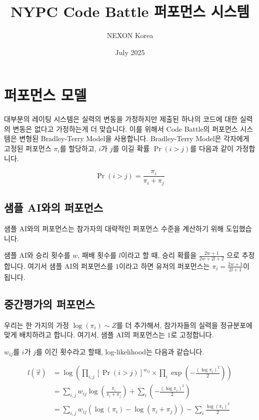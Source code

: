 \documentclass{article}
\title{NYPC Code Battle 퍼포먼스 시스템}
\author{NEXON Korea}
\date{July 2025}
\newcommand{\Prf}[1]{\Pr(#1)}
\begin{document}
\maketitle

\section{퍼포먼스 모델}

대부분의 레이팅 시스템은 실력의 변동을 가정하지만 제출된 하나의 코드에 대한 실력의 변동은 없다고 가정하는게 더 맞습니다. 이를 위해서 Code Battle의 퍼포먼스 시스템은 변형된 Bradley-Terry Model을 사용합니다. Bradley-Terry Model은 각자에게 고정된 퍼포먼스 $\pi_i$를 할당하고, $i$가 $j$를 이길 확률 $\Prf{i>j}$를 다음과 같이 가정합니다. \cite{azermelo1929}

$$\Prf{i > j} = \frac{\pi_i}{\pi_i + \pi_j} $$

\subsection{샘플 AI와의 퍼포먼스}

샘플 AI와의 퍼포먼스는 참가자의 대략적인 퍼포먼스 수준을 계산하기 위해 도입했습니다. 

샘플 AI와 승리 횟수를 $w$, 패배 횟수를 $l$이라고 할 때, 승리 확률을 $\frac{2w+1}{2w+2l+2}$ 으로 추정합니다. 여기서 샘플 AI의 퍼포먼스를 $1$이라고 하면 유저의 퍼포먼스는 $\pi_i = \frac{2w+1}{2l+1}$이 됩니다.

\subsection{중간평가의 퍼포먼스}

우리는 한 가지의 가정 $\log (\pi_i) \sim Z$를 더 추가해서, 참가자들의 실력을 정규분포에 맞게 배치하려고 합니다. 여기서, 샘플 AI의 퍼포먼스는 $1$로 고정합니다.

$w_{ij}$를 $i$가 $j$를 이긴 횟수라고 할때, log-likelihood는 다음과 같습니다.

\begin{align*}
l(\vec{\pi}) 
&= \log\left(
    \prod_{i,j} \left[\Prf{i > j}\right]^{w_{ij}} 
    \times \prod_i \exp\left(-\frac{(\log \pi_i)^2}{2}\right)
  \right) \\
&= \sum_{i,j} w_{ij} \log\left(\frac{\pi_i}{\pi_i + \pi_j}\right)
  + \sum_i \left(-\frac{(\log \pi_i)^2}{2}\right) \\
&= \sum_{i,j} w_{ij} \left(\log(\pi_i) - \log(\pi_i + \pi_j)\right) - \sum_i \frac{\log(\pi_i)^2}{2} 
\end{align*}
\end{document}

